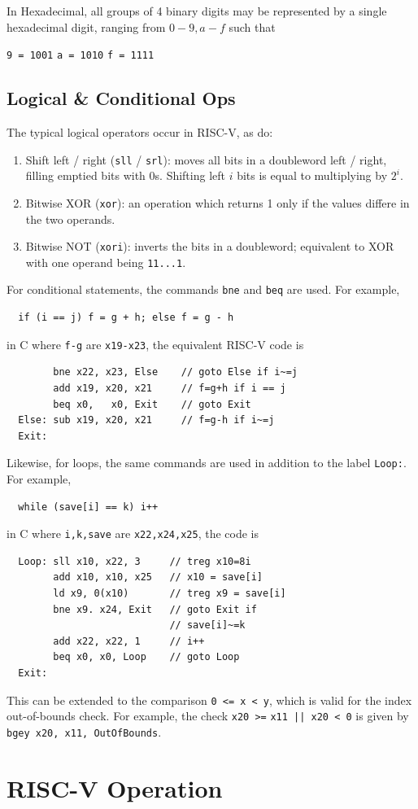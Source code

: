 \documentclass{tufte-book}
\begin{document}
In Hexadecimal, all groups of 4 binary digits may be represented by a single hexadecimal digit, ranging from $0 - 9, a - f$ such that \begin{center}
  \verb|9 = 1001| \qquad \verb|a = 1010| \qquad \verb|f = 1111|
\end{center}

\section{Logical \& Conditional Ops}
The typical logical operators occur in RISC-V, as do:
\begin{enumerate}
  \item Shift left / right (\verb|sll| / \verb|srl|): moves all bits in a doubleword left / right, filling emptied bits with 0s. Shifting left $i$ bits is equal to multiplying by $2^i$.
  \item Bitwise XOR (\verb|xor|): an operation which returns 1 only if the values differe in the two operands.
  \item Bitwise NOT (\verb|xori|): inverts the bits in a doubleword; equivalent to XOR with one operand being \verb|11...1|.
\end{enumerate}
For conditional statements, the commands \verb|bne| and \verb|beq| are used. For example,
\begin{verbatim}
  if (i == j) f = g + h; else f = g - h
\end{verbatim}
in C where \verb|f-g| are \verb|x19-x23|, the equivalent RISC-V code is
\begin{lstlisting}
        bne x22, x23, Else    // goto Else if i~=j
        add x19, x20, x21     // f=g+h if i == j
        beq x0,   x0, Exit    // goto Exit
  Else: sub x19, x20, x21     // f=g-h if i~=j
  Exit:
\end{lstlisting}
Likewise, for loops, the same commands are used in addition to the label \verb|Loop:|. For example,
\begin{verbatim}
  while (save[i] == k) i++
\end{verbatim}
in C where \verb|i,k,save| are \verb|x22,x24,x25|, the code is
\begin{lstlisting}
  Loop: sll x10, x22, 3     // treg x10=8i
        add x10, x10, x25   // x10 = save[i]
        ld x9, 0(x10)       // treg x9 = save[i]
        bne x9. x24, Exit   // goto Exit if
                            // save[i]~=k
        add x22, x22, 1     // i++
        beq x0, x0, Loop    // goto Loop
  Exit:
\end{lstlisting}
This can be extended to the comparison \verb|0 <= x < y|, which is valid for the index out-of-bounds check. For example, the check \verb$x20 >=$ \verb$x11 || x20 < 0$ is given by \verb$bgey x20, x11, OutOfBounds$.

\chapter{RISC-V Operation}
\end{document}
